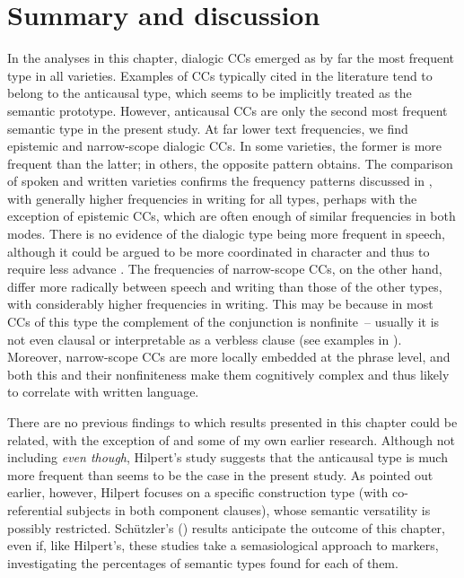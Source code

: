 \section{\label{bkm:Ref494882555}Summary and discussion}\label{sec:8.3}

In the analyses in this chapter, dialogic CCs emerged as by far the most frequent type in all varieties. Examples of CCs typically cited in the literature tend to belong to the anticausal type, which seems to be implicitly treated as the semantic prototype. However, anticausal CCs are only the second most frequent semantic type in the present study. At far lower text frequencies, we find epistemic and narrow-scope dialogic CCs. In some varieties, the former is more frequent than the latter; in others, the opposite pattern obtains. The comparison of spoken and written varieties confirms the frequency patterns discussed in , with generally higher frequencies in writing for all types, perhaps with the exception of epistemic CCs, which are often enough of similar frequencies in both modes. There is no evidence of the dialogic type being more frequent in speech, although it could be argued to be more coordinated in character and thus to require less advance . The frequencies of narrow-scope CCs, on the other hand, differ more radically between speech and writing than those of the other types, with considerably higher frequencies in writing. This may be because in most CCs of this type the complement of the conjunction is nonfinite~– usually it is not even clausal or interpretable as a verbless clause (see examples in ). Moreover, narrow-scope CCs are more locally embedded at the phrase level, and both this and their nonfiniteness make them cognitively complex and thus likely to correlate with written language.

There are no previous findings to which results presented in this chapter could be related, with the exception of \citet{Hilpert2013a} and some of my own earlier research. Although not including \textit{even though}, Hilpert’s study suggests that the anticausal type is much more frequent  than seems to be the case in the present study. As pointed out earlier, however, Hilpert focuses on a specific construction type (with co-referential subjects in both component clauses), whose semantic versatility is possibly restricted. Schützler’s (\citeyear{Schützler2017, Schützler2018b}) results anticipate the outcome of this chapter, even if, like Hilpert’s, these studies take a semasiological approach to markers, investigating the percentages of semantic types found for each of them.

